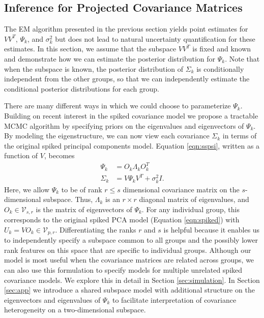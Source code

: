 \documentclass{statsoc}
\begin{document}
\subsection{Inference for Projected Covariance Matrices}
\label{sec:bayes}

The EM algorithm presented in the previous section yields point
estimates for $VV^T$, $\Psi_k$, and $\sigma_k^2$ but does not lead to natural
uncertainty quantification for these estimates.  In this section, we
assume that the subspace $VV^T$ is fixed and known and demonstrate how
we can estimate the posterior distribution for $\Psi_k$.   Note that when
the subspace is known, the posterior distribution of $\Sigma_k$ is
conditionally independent from the other groups, so that we can
independently estimate the conditional posterior distributions for each
group.


There are many different ways in which we could choose to parameterize
$\Psi_k$.  Building on recent interest in the spiked covariance model
\citep{Donoho2013, Paul2007} we propose a tractable MCMC algorithm by
specifying priors on the eigenvalues and eigenvectors of $\Psi_k$.  By
modeling the eigenstructure, we can now view each covariance
$\Sigma_k$ in terms of the original spiked principal components model.  Equation \ref{eqn:sspsi}, written as a function of
$V$, becomes
%
\begin{align}
\nonumber \Psi_k &= O_k\Lambda_kO_k^T\\
\Sigma_k &= V\Psi_kV^T + \sigma^2_kI.
\label{eqn:ss}
\end{align}
%
\noindent Here, we allow $\Psi_k$ to be of rank $r \leq s$ dimensional
covariance matrix on the $s$-dimensional subspace.  Thus, $\Lambda_k$
is an $r \times r$ diagonal matrix of eigenvalues, and
$O_k \in \mathcal{V}_{s,r}$ is the matrix of eigenvectors of $\Psi_k$.
For any individual group, this corresponds to the original spiked PCA
model (Equation \ref{eqn:spiked}) with
$U_k = VO_k \in \mathcal{V}_{p, r}$.  Differentiating the ranks $r$
and $s$ is helpful because it enables us to independently specify a
subspace common to all groups and the possibly lower rank features on
this space that are specific to individual groups.  Although our model
is most useful when the covariance matrices are related across groups,
we can also use this formulation to specify models for multiple
unrelated spiked covariance models.  We explore this in detail in
Section \ref{sec:simulation}.  In Section \ref{sec:app} we introduce a
shared subspace model with additional structure on the eigenvectors
and eigenvalues of $\Psi_k$ to facilitate interpretation of covariance
heterogeneity on a two-dimensional subspace.
\end{document}
